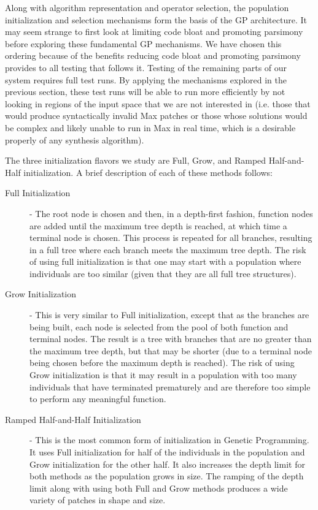 \documentclass[a4paper,12pt]{report} 	%
\numberwithin{figure}{chapter}
\numberwithin{table}{chapter}
\numberwithin{equation}{chapter}
\begin{document}
\begin{flushleft}
Along with algorithm representation and operator selection, the population initialization and selection mechanisms form the basis of the GP architecture. It may seem strange to first look at limiting code bloat and promoting parsimony before exploring these fundamental GP mechanisms. We have chosen this ordering because of the benefits reducing code bloat and promoting parsimony provides to all testing that follows it. Testing of the remaining parts of our system requires full test runs. By applying the mechanisms explored in the previous section, these test runs will be able to run more efficiently by not looking in regions of the input space that we are not interested in (i.e. those that would produce syntactically invalid Max patches or those whose solutions would be complex and likely unable to run in Max in real time, which is a desirable properly of any synthesis algorithm).

The three initialization flavors we study are Full, Grow, and Ramped Half-and-Half initialization. A brief description of each of these methods follows:
\begin{description}
\item [Full Initialization] - The root node is chosen and then, in a depth-first fashion, function nodes are added until the maximum tree depth is reached, at which time a terminal node is chosen. This process is repeated for all branches, resulting in a full tree where each branch meets the maximum tree depth. The risk of using full initialization is that one may start with a population where individuals are too similar (given that they are all full tree structures).
\item [Grow Initialization] - This is very similar to Full initialization, except that as the branches are being built, each node is selected from the pool of both function and terminal nodes. The result is a tree with branches that are no greater than the maximum tree depth, but that may be shorter (due to a terminal node being chosen before the maximum depth is reached). The risk of using Grow initialization is that it may result in a population with too many individuals that have terminated prematurely and are therefore too simple to perform any meaningful function.
\item [Ramped Half-and-Half Initialization] - This is the most common form of initialization in Genetic Programming. It uses Full initialization for half of the individuals in the population and Grow initialization for the other half. It also increases the depth limit for both methods as the population grows in size. The ramping of the depth limit along with using both Full and Grow methods produces a wide variety of patches in shape and size.
\end{description}


\end{flushleft}
\end{document}
